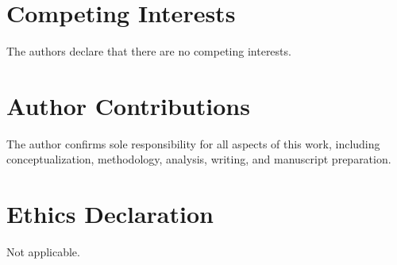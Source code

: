 \documentclass{article}
\begin{document}
\section*{Competing Interests}
The authors declare that there are no competing interests.

\section*{Author Contributions}
The author confirms sole responsibility for all aspects of this work, including conceptualization, methodology, analysis, writing, and manuscript preparation.

\section*{Ethics Declaration}
Not applicable.

\end{document}
